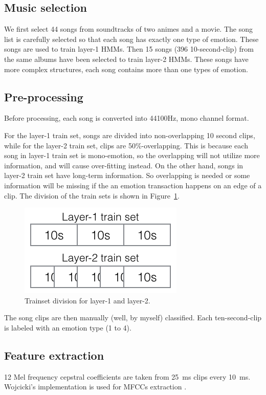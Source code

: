 \documentclass{IEEEtran}
\begin{document}
  \subsection{Music selection}

  We first select 44 songs from soundtracks of two animes and a movie. The
  song list is carefully selected so that each song has exactly one type of emotion.
  These songs are used to train layer-1 HMMs. Then 15 songs (396 10-second-clip) from the same
  albums have been selected to train layer-2 HMMs. These songs have more
  complex structures, each song contains more than one types of emotion.

  \subsection{Pre-processing}
  Before processing, each song is converted into 44100Hz, mono channel format.

  For the layer-1 train set, songs are divided into non-overlapping 10 second
  clips, while for the layer-2 train set, clips are 50\%-overlapping. This is
  because each song in layer-1 train set is mono-emotion, so the
  overlapping will not utilize more information, and will cause over-fitting instead. On the other hand,
  songs in layer-2 train set have long-term information. So overlapping is
  needed or some information will be missing if the an emotion transaction
  happens on an edge of a clip. The division of the train sets is shown in
  Figure~\ref{fig:trainset_division}.

  \begin{figure}[htbp]
    \centering
    \includegraphics[width=0.5\columnwidth]{trainset_division.png}
    \caption{Trainset division for layer-1 and layer-2.}
    \label{fig:trainset_division}
  \end{figure}

  The song clips are then manually (well, by myself) classified. Each
  ten-second-clip is labeled with an emotion type (1 to 4).

  \subsection{Feature extraction}
  12 Mel frequency cepstral coefficients are taken from 25~ms clips every
  10~ms. Wojcicki's implementation is used for MFCCs extraction \cite{wojcicki2011htk}.
\end{document}
